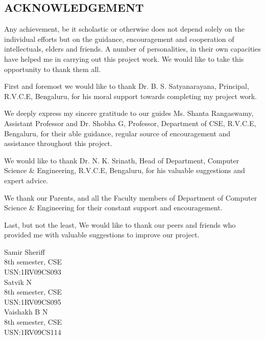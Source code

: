 \documentclass[12pt]{report}
\begin{document}
  
\setcounter{page}{1}
\begin{center}
\section*{ACKNOWLEDGEMENT}
\end{center}
Any achievement, be it scholastic or otherwise does not depend solely on the individual efforts but on the guidance, encouragement and cooperation of intellectuals, elders and friends. A number of personalities, in their own capacities have helped me in carrying out this project work. We would like to take this opportunity to thank them all.

First and foremost we would like to thank Dr. B. S. Satyanarayana, Principal, R.V.C.E, Bengaluru, for his moral support towards completing my project work.

We deeply express my sincere gratitude to our guides Ms. Shanta Rangaswamy, Assistant Professor and Dr. Shobha G, Professor, Department of CSE, R.V.C.E, Bengaluru, for their able guidance, regular source of encouragement and assistance throughout this project. 

We would like to thank Dr. N. K. Srinath, Head of Department, Computer Science & Engineering, R.V.C.E, Bengaluru, for his valuable suggestions and expert advice.

We thank our Parents, and all the Faculty members of Department of Computer Science & Engineering for their constant support and encouragement.

Last, but not the least, We would like to thank our peers and friends who provided me with valuable suggestions to improve our project.
\begin{flushright}
Samir Sheriff\\
8th semester, CSE\\
USN:1RV09CS093\\

Satvik N\\
8th semester, CSE\\
USN:1RV09CS095\\

Vaishakh B N\\ 
8th semester, CSE\\
USN:1RV09CS114\\

\end{flushright}
\end{document}
